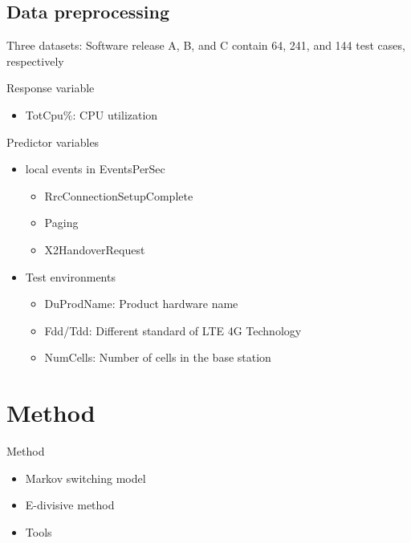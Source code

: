 \documentclass{beamer}
\begin{document}
\subsection{Data preprocessing}
\begin{frame}
Three datasets: Software release A, B, and C contain 64, 241, and 144 test cases, respectively

\vspace{1em}

Response variable 
\begin{itemize}
	\item TotCpu\%: CPU utilization
\end{itemize}	
\vspace{1em}

Predictor variables
\begin{itemize}
		\item local events in EventsPerSec
	\begin{itemize}
		\item RrcConnectionSetupComplete
		\item Paging
		\item X2HandoverRequest
	\end{itemize}	
		\item Test environments
	\begin{itemize}
		\item DuProdName: Product hardware name
		\item Fdd/Tdd: Different standard of LTE 4G Technology
		\item NumCells: Number of cells in the base station
	\end{itemize}
\end{itemize}

\end{frame}

\section{Method} 
\begin{frame}
Method 
\begin{itemize}
	\item Markov switching model
	\item E-divisive method
	\item Tools
\end{itemize}
\end{frame}
\end{document}
